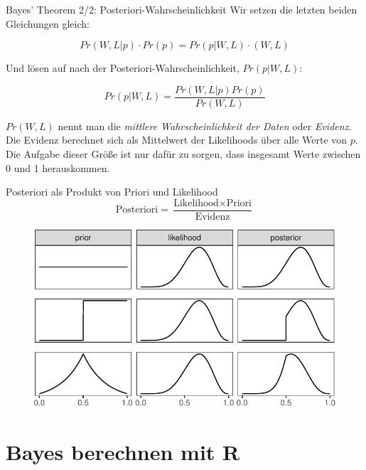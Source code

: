 \documentclass[
  ngerman,
  ignorenonframetext,
]{beamer}
\begin{document}
\begin{frame}{Bayes' Theorem 2/2: Posteriori-Wahrscheinlichkeit}
\protect\hypertarget{bayes-theorem-22-posteriori-wahrscheinlichkeit}{}
Wir setzen die letzten beiden Gleichungen gleich:

\[Pr(W,L|p) \cdot Pr(p) = Pr(p|W,L) \cdot (W,L)\]

Und lösen auf nach der Posteriori-Wahrscheinlichkeit, \(Pr(p|W,L)\):

\[Pr(p|W,L) = \frac{Pr(W,L|p) Pr(p)}{Pr(W,L)}\]

\(Pr(W,L)\) nennt man die \emph{mittlere Wahrscheinlichkeit der Daten}
oder \emph{Evidenz}. Die Evidenz berechnet sich als Mittelwert der
Likelihoods über alle Werte von \(p\). Die Aufgabe dieser Größe ist nur
dafür zu sorgen, dass insgesamt Werte zwischen 0 und 1 herauskommen.
\end{frame}

\begin{frame}{Posteriori als Produkt von Priori und Likelihood}
\protect\hypertarget{posteriori-als-produkt-von-priori-und-likelihood}{}
\[\text{Posteriori} = \frac{\text{Likelihood} \times \text{Priori}}{\text{Evidenz}}\]

\begin{figure}[H]
\includegraphics[width=0.7\linewidth]{unnamed-chunk-23-1} \end{figure}
\end{frame}

\hypertarget{bayes-berechnen-mit-r}{%
\section{Bayes berechnen mit R}\label{bayes-berechnen-mit-r}}
\end{document}
